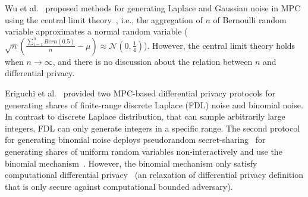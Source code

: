 Wu et al.~\cite{wu2016inherit} proposed methods for generating Laplace and Gaussian noise in MPC using the central limit theory~\cite{athreya2006measure}, i.e., the aggregation of $n$ of Bernoulli random variable approximates a normal random variable ($\sqrt{n}\left(\frac{\sum_{i = 1}^{n}  Bern\left(0.5\right) }{n}-\mu\right) \approx \mathcal{N} \left(0,\frac{1}{4}\right)   $). However, the central limit theory holds when $n \to \infty $, and there is no discussion about the relation between $n$ and differential privacy.

Eriguchi et al.~\cite{eriguchi2021efficient} provided two MPC-based differential privacy protocols for generating shares of finite-range discrete Laplace (FDL) noise and binomial noise. In contrast to discrete Laplace distribution, that can sample arbitrarily large integers, FDL can only generate integers in a specific range. The second protocol for generating binomial noise deploys pseudorandom secret-sharing~\cite{cramer2005share} for generating shares of uniform random variables non-interactively and use the binomial mechanism~\cite{agarwal2018cpsgd}. However, the binomial mechanism only satisfy computational differential privacy~\cite{mironov2009computational} (an relaxation of differential privacy definition that is only secure against computational bounded adversary).




